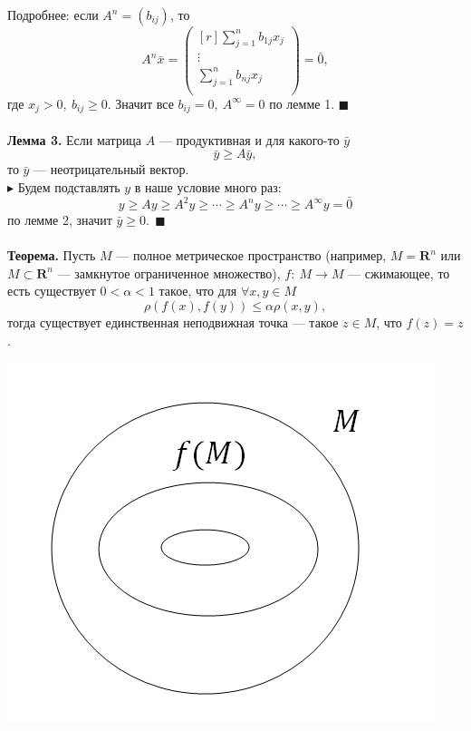 \documentclass[12pt]{article}
\theoremstyle{definition}
\numberwithin{equation}{section}
\begin{document}
Подробнее: если $A^n=(b_{ij})$, то 
\[A^n \bar x = \begin{pmatrix}[r]
\sum\limits_{j=1}^n b_{1j}x_j\\
\vdots\\
\sum\limits_{j=1}^n b_{nj}x_j\\
\end{pmatrix}=\bar 0,\]
где $x_j>0,~ b_{ij}\geqslant 0$. Значит все $b_{ij}=0,~A^{\infty}=0$ по лемме 1.   $\blacksquare$\\
\\
\textbf{Лемма 3.} Если матрица $A$ --- продуктивная и для какого-то $\bar y$
$$\bar y \geqslant A\bar y,$$ то $\bar y$ --- неотрицательный вектор.\\
$\blacktriangleright$ Будем подставлять $y$ в наше условие много раз: $$y\geqslant Ay \geqslant A^2y \geqslant \cdots \geqslant A^n y \geqslant \cdots \geqslant A^{\infty} y =\bar 0$$ по лемме 2, значит $\bar y \geqslant 0.~~\blacksquare$\\
\\
\textbf{Теорема.} Пусть $M$ --- полное метрическое пространство (например, $M=\textbf{R}^n$ или $M \subset \textbf{R}^n$ --- замкнутое ограниченное множество), $f:~M\to M$ --- сжимающее, то есть существует $0<\alpha <1$ такое, что для $\forall x, y \in M$
$$\rho(f(x), f(y))\leqslant \alpha \rho(x, y),$$
тогда существует единственная неподвижная точка --- такое $z\in M$, что $f(z)=z$.\\
\begin{center}
\includegraphics[scale=0.7]{l14_1.png}\\
\end{center}
\end{document}
